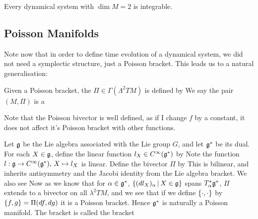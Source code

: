 \documentclass{article}
\begin{document}
\begin{corollary}
Every dynamical system with $\dim M = 2$ is integrable. 
\end{corollary}

\subsection{Poisson Manifolds}

Note now that in order to define time evolution of a dynamical system, we did not need a symplectic structure, just a Poisson bracket. This leads us to a natural generalisation:

\begin{definition}
Given a Poisson bracket, the  $\Pi \in \Gamma(\Lambda^2 TM)$ is defined by 
We say the pair $(M,\Pi)$ is a 
\end{definition}

\begin{remark}
Note that the Poisson bivector is well defined, as if I change $f$ by a constant, it does not affect it's Poisson bracket with other functions. 
\end{remark}

\begin{example}\label{ex:CQIS:KKSbracket}
Let $\mf{g}$ be the Lie algebra associated with the Lie group $G$, and let $\mf{g}^\ast$ be its dual. For each $X \in \mf{g}$, define the linear function $l_X \in C^\infty(\mf{g}^\ast)$ by 
Note the function $l:\mf{g} \to C^\infty(\mf{g}^\ast), \, X \mapsto l_X$ is linear. Define the bivector $\Pi$ by
This is bilinear, and inherits antisymmetry and the Jacobi identity from the Lie algebra bracket. We also see 
Now as we know that for $\alpha \in \mf{g}^\ast$, $\pbrace{(dl_X)_\alpha \, | \, X \in \mf{g}}$ spans $T_\alpha^\ast \mf{g}^\ast$, $\Pi$ extends to a bivector on all $\lambda^2 TM$, and we see that if we define $\acomm[\cdot]{\cdot}$ by $\acomm[f]{g} = \Pi(df,dg)$ it is a Poisson bracket. Hence $\mf{g}^\ast$ is naturally a Poisson manifold. The bracket is called the  bracket 
\end{example}
\end{document}
